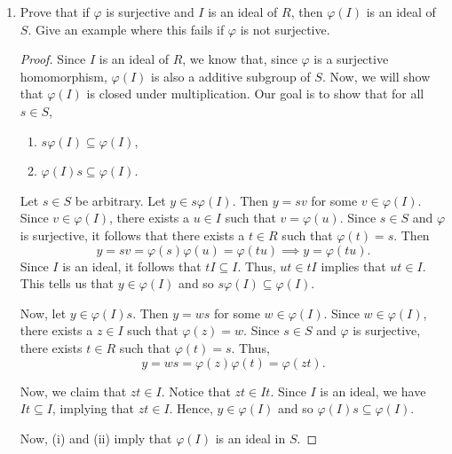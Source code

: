 \documentclass[a4paper]{article}
\begin{document}
\begin{problem}
\begin{enumerate}
\begin{proof}
           Now, (i) and (ii) imply that \( J \cap R  \) is an ideal of \( R  \). 
            \end{proof}
        \item[(b)] Prove that if \( \varphi \) is surjective and \( I  \) is an ideal of \( R  \), then \( \varphi(I) \) is an ideal of \( S  \). Give an example where this fails if \( \varphi  \) is not surjective.
            \begin{proof}
            Since \( I  \) is an ideal of \( R  \), we know that, since \( \varphi  \) is a surjective homomorphism, \( \varphi(I) \) is also a additive subgroup of \( S  \). Now, we will show that \( \varphi(I) \) is closed under multiplication. Our goal is to show that for all \( s \in S  \),  
            \begin{enumerate}
                \item[(i)] \( s \varphi(I) \subseteq \varphi(I) \),
                \item[(ii)] \( \varphi(I) s \subseteq \varphi(I) \).
            \end{enumerate}
            Let \( s \in S  \) be arbitrary. Let \( y \in s \varphi(I) \). Then             \( y = sv  \) for some \( v \in \varphi(I) \). Since \( v \in \varphi(I) \), there exists a \( u \in I  \) such that \( v = \varphi(u) \). Since \( s \in S  \) and \( \varphi   \) is surjective, it follows that there exists a \( t \in R  \) such that \( \varphi(t) = s  \). Then
            \[  y = sv = \varphi(s) \varphi(u) = \varphi(tu) \implies y = \varphi(tu). \]
            Since \( I \) is an ideal, it follows that \( t I \subseteq  I  \). Thus, \( ut \in tI \) implies that \( ut \in I  \). This tells us that \( y \in \varphi(I) \) and so \( s \varphi(I) \subseteq \varphi(I) \). 

            Now, let \( y \in \varphi(I) s \). Then \( y = ws  \) for some \( w \in \varphi(I) \). Since \( w \in \varphi(I) \), there exists a \( z \in I  \) such that \( \varphi(z) = w  \). Since \( s \in S  \) and \( \varphi  \) is surjective, there exists \( t \in R  \) such that \( \varphi(t) = s  \). Thus,
            \[  y = ws = \varphi(z) \varphi(t) = \varphi(zt). \]

            Now, we claim that \( zt \in I  \). Notice that \( zt \in I t \). Since \( I  \) is an ideal, we have \( It \subseteq I  \), implying that \( zt \in I  \). Hence, \( y \in \varphi(I) \) and so \( \varphi(I) s \subseteq \varphi(I) \). 

            Now, (i) and (ii) imply that \( \varphi(I) \) is an ideal in \( S  \).
            \end{proof}
    \end{enumerate}
\end{problem}
\end{document}
